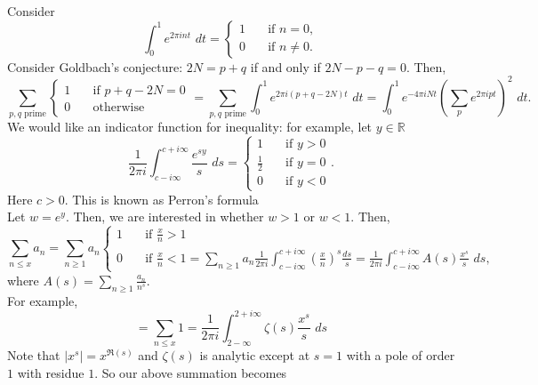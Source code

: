 Consider
\begin{equation*}
\int_{0}^{1} e^{2\pi i nt} \,\, dt = \begin{cases}
1 \quad &\text{if } n=0, \\
0 &\text{if } n \ne 0.
\end{cases}
\end{equation*}
Consider Goldbach's conjecture:  $2N=p+q$ if and only if $2N-p-q=0$.  Then,
\begin{equation*}
\sum_{p,q \text{ prime}} \begin{cases}
1 \quad &\text{if } p+q-2N=0 \\
0 & \text{otherwise}
\end{cases}=
\sum_{p,q \text{ prime}} \int_{0}^{1} e^{2\pi i (p+q-2N)t} \,\, dt = \int_{0}^{1} e^{-4\pi iNt}\left(\sum_{p} e^{2\pi ipt}\right)^{2} \,\, dt.
\end{equation*}
We would like an indicator function for inequality:  for example, let $y \in \mathbb{R}$
\begin{equation*}
\frac{1}{2\pi i} \int_{c-i\infty}^{c+i\infty} \frac{e^{sy}}{s} \,\, ds = \begin{cases}
1 \quad &\text{if } y > 0 \\
\frac{1}{2} &\text{if } y=0 \\
0 &\text{if } y < 0
\end{cases}.
\end{equation*}
Here $c > 0$.  This is known as Perron's formula\\
\indent Let $w=e^{y}$.  Then, we are interested in whether $w > 1$ or $w < 1$.  Then,
\begin{equation*}
\sum_{n \le x} a_{n} = \sum_{n \ge 1} a_{n} \begin{cases}
1 \quad &\text{if } \frac{x}{n} > 1 \\
0 &\text{if } \frac{x}{n} < 1 = \sum_{n \ge 1} a_{n}\frac{1}{2\pi i} \int_{c-i\infty}^{c+i\infty} \left(\frac{x}{n}\right)^{s} \frac{ds}{s} = \frac{1}{2\pi i} \int_{c-i\infty}^{c+i\infty} A(s)\frac{x^{s}}{s} \,\, ds,
\end{cases}
\end{equation*}
where $A(s)=\sum_{n \ge 1} \frac{a_{n}}{n^{s}}$.\\
\indent For example,
\begin{equation*}
[x] = \sum_{n \le x} 1 = \frac{1}{2\pi i} \int_{2-\infty}^{2+i\infty} \zeta(s)\frac{x^{s}}{s} \,\, ds
\end{equation*}
Note that $|x^{s}|=x^{\Re(s)}$ and $\zeta(s)$ is analytic except at $s=1$ with a pole of order $1$ with residue $1$.  So our above summation becomes
